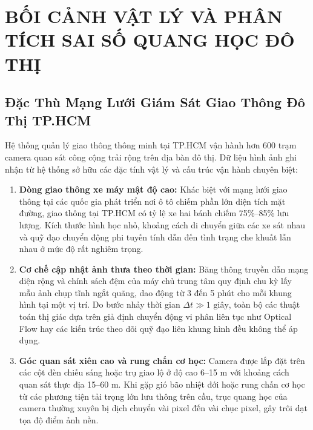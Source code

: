 \documentclass[11pt,a4paper]{article}
\begin{document}
\clearpage

\thispagestyle{plain}
\tableofcontents

\clearpage

\section{BỐI CẢNH VẬT LÝ VÀ PHÂN TÍCH SAI SỐ QUANG HỌC ĐÔ THỊ}

\subsection{Đặc Thù Mạng Lưới Giám Sát Giao Thông Đô Thị TP.HCM}
Hệ thống quản lý giao thông thông minh tại TP.HCM vận hành hơn 600 trạm camera quan sát công cộng trải rộng trên địa bàn đô thị. Dữ liệu hình ảnh ghi nhận từ hệ thống sở hữu các đặc tính vật lý và cấu trúc vận hành chuyên biệt:
\begin{enumerate}
    \item \textbf{Dòng giao thông xe máy mật độ cao:} Khác biệt với mạng lưới giao thông tại các quốc gia phát triển nơi ô tô chiếm phần lớn diện tích mặt đường, giao thông tại TP.HCM có tỷ lệ xe hai bánh chiếm 75\%--85\% lưu lượng. Kích thước hình học nhỏ, khoảng cách di chuyển giữa các xe sát nhau và quỹ đạo chuyển động phi tuyến tính dẫn đến tình trạng che khuất lẫn nhau ở mức độ rất nghiêm trọng.
    \item \textbf{Cơ chế cập nhật ảnh thưa theo thời gian:} Băng thông truyền dẫn mạng diện rộng và chính sách đệm của máy chủ trung tâm quy định chu kỳ lấy mẫu ảnh chụp tĩnh ngắt quãng, dao động từ 3 đến 5 phút cho mỗi khung hình tại một vị trí. Do bước nhảy thời gian $\Delta t \gg 1\text{ giây}$, toàn bộ các thuật toán thị giác dựa trên giả định chuyển động vi phân liên tục như Optical Flow hay các kiến trúc theo dõi quỹ đạo liên khung hình đều không thể áp dụng.
    \item \textbf{Góc quan sát xiên cao và rung chấn cơ học:} Camera được lắp đặt trên các cột đèn chiếu sáng hoặc trụ giao lộ ở độ cao 6--15 m với khoảng cách quan sát thực địa 15--60 m. Khi gặp gió bão nhiệt đới hoặc rung chấn cơ học từ các phương tiện tải trọng lớn lưu thông trên cầu, trục quang học của camera thường xuyên bị dịch chuyển vài pixel đến vài chục pixel, gây trôi dạt tọa độ điểm ảnh nền.
\end{enumerate}
\end{document}
